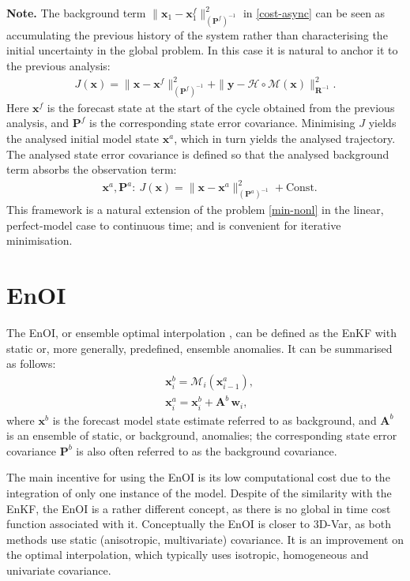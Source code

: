 \documentclass[11pt]{report}
\newcommand{\mb} {\mathbf}
\begin{document}
{
  \setlength{\abovedisplayskip}{2pt}
  \setlength{\belowdisplayskip}{2pt}
  \scriptsize
  {\bf Note.} The background term $\|\mb x_1 - \mb x_1^f\|^2_{(\mb P^f)^{-1}}$ in \eqref{cost-async} can be seen as accumulating the previous history of the system rather than characterising the initial uncertainty in the global problem.
  In this case it is natural to anchor it to the previous analysis:
  \begin{align}
    J(\mb x) = \|\mb x - \mb x^f\|^2_{(\mb P^f)^{-1}} + \|\mb y - \mathcal H \circ \mathcal M(\mb x)\|^2_{\mb R^{-1}}.
  \end{align}
  Here $\mb x^f$ is the forecast state at the start of the cycle obtained from the previous analysis, and $\mb P^f$ is the corresponding state error covariance.
  Minimising $J$ yields the analysed initial model state $\mb x^a$, which in turn yields the analysed trajectory.
  The analysed state error covariance is defined so that the analysed background term absorbs the observation term:
  \begin{align*}
    &\mb x^a, \mb P^a: \ J(\mb x) = \|\mb x - \mb x^a\|^2_{(\mb P^a)^{-1}} + \mathrm{Const}.
  \end{align*}
  This framework is a natural extension of the problem \eqref{min-nonl} in the linear, perfect-model case to continuous time; and is convenient for iterative minimisation.\par
}

\section{EnOI}

The EnOI, or ensemble optimal interpolation \citep{eve03a}, can be defined as the EnKF with static or, more generally, predefined, ensemble anomalies.
It can be summarised as follows:
\begin{align}
  \label{enoi-for}
  & \mb x^b_i = \mathcal M_i(\mb x^a_{i-1}),\\
  & \mb x^a_i = \mb x^b_i + \mb A^b \, \mb w_i,
\end{align}
where $\mb x^b$ is the forecast model state estimate referred to as background, and $\mb A^b$ is an ensemble of static, or background, anomalies; the corresponding state error covariance $\mb P^b$ is also often referred to as the background covariance.

The main incentive for using the EnOI is its low computational cost due to the integration of only one instance of the model.
Despite of the similarity with the EnKF, the EnOI is a rather different concept, as there is no global in time cost function associated with it.
Conceptually the EnOI is closer to 3D-Var, as both methods use static (anisotropic, multivariate) covariance.
It is an improvement on the optimal interpolation, which typically uses isotropic, homogeneous and univariate covariance.
\end{document}
